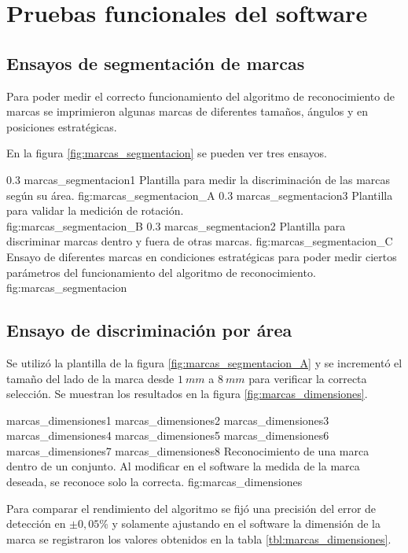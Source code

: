 \section{Pruebas funcionales del software}
\label{sec:pruebasHW}

\subsection{Ensayos de segmentación de marcas}
Para poder medir el correcto funcionamiento del algoritmo de reconocimiento de marcas se imprimieron algunas marcas de diferentes tamaños, ángulos y en posiciones estratégicas.\par
En la figura \ref{fig:marcas_segmentacion} se pueden ver tres ensayos.

   \subfigabc
   {0.3} {marcas_segmentacion1} {Plantilla para medir la discriminación de las marcas según su área.} {fig:marcas_segmentacion_A}
   {0.3} {marcas_segmentacion3} {Plantilla para validar la medición de rotación.\\ \vphantom{1}} {fig:marcas_segmentacion_B}
   {0.3} {marcas_segmentacion2} {Plantilla para discriminar marcas dentro y fuera de otras marcas.} {fig:marcas_segmentacion_C}
   {Ensayo de diferentes marcas en condiciones estratégicas para poder medir ciertos parámetros del funcionamiento del algoritmo de reconocimiento.}
   {fig:marcas_segmentacion}

\subsection{Ensayo de discriminación por área}

Se utilizó la plantilla de la figura \ref{fig:marcas_segmentacion_A} y se incrementó el tamaño del lado de la marca desde $1\:mm$ a $8\:mm$ para verificar la correcta selección. Se muestran los resultados en la figura \ref{fig:marcas_dimensiones}.

\subfigfourfour
   {marcas_dimensiones1}
   {marcas_dimensiones2}
   {marcas_dimensiones3}
   {marcas_dimensiones4}
   {marcas_dimensiones5}
   {marcas_dimensiones6}
   {marcas_dimensiones7}
   {marcas_dimensiones8}
   {Reconocimiento de una marca dentro de un conjunto. Al modificar en el software la medida de la marca deseada, se reconoce solo la correcta.}
   {fig:marcas_dimensiones}

   Para comparar el rendimiento del algoritmo se fijó una precisión del error de detección en $\pm0,05$\% y solamente ajustando en el software la dimensión de la marca se registraron los valores obtenidos en la tabla \ref{tbl:marcas_dimensiones}.\par

